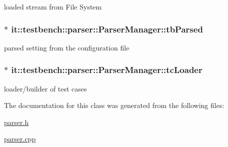 loaded stream from File System \hypertarget{classit_1_1testbench_1_1parser_1_1ParserManager_a4fde8535856ac3efcf06b06b5de64254}{
\subsubsection[{tb\-Parsed}]{$\ast$ it\-::testbench\-::parser\-::\-Parser\-Manager\-::tb\-Parsed\hspace{0.3cm}{\ttfamily [private]}}}\label{d2/d53/classit_1_1testbench_1_1parser_1_1ParserManager_a4fde8535856ac3efcf06b06b5de64254}
parsed setting from the configuration file \hypertarget{classit_1_1testbench_1_1parser_1_1ParserManager_aac1d4a536ac5b3d19a970e9692d2ddff}{
\subsubsection[{tc\-Loader}]{$\ast$ it\-::testbench\-::parser\-::\-Parser\-Manager\-::tc\-Loader\hspace{0.3cm}{\ttfamily [private]}}}\label{d2/d53/classit_1_1testbench_1_1parser_1_1ParserManager_aac1d4a536ac5b3d19a970e9692d2ddff}
loader/builder of test cases 

The documentation for this class was generated from the following files\-:\begin{DoxyCompactItemize}
\item 
\hyperlink{parser_8h}{parser.\-h}\item 
\hyperlink{parser_8cpp}{parser.\-cpp}\end{DoxyCompactItemize}

